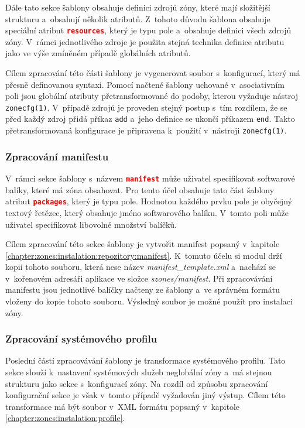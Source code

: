 Dále tato sekce šablony obsahuje definici zdrojů zóny, které mají složitější strukturu a~obsahují několik atributů. Z~tohoto
důvodu šablona obsahuje speciální atribut \lstinline[language=json]{resources}, který je typu pole a~obsahuje definici
všech zdrojů zóny. V~rámci jednotlivého zdroje je použita stejná technika definice atributu jako ve výše zmíněném případě
globálních atributů.

Cílem zpracování této části šablony je vygenerovat soubor s~konfigurací, který má přesně definovanou syntaxi. Pomocí načtené
šablony uchované v~asociativním poli jsou globální atributy přetransformované do podoby, kterou vyžaduje nástroj \verb|zonecfg(1)|.
V~případě zdrojů je proveden stejný postup s~tím rozdílem, že se před každý zdroj přidá příkaz \verb|add| a~jeho definice
se ukončí příkazem \verb|end|. Takto přetransformovaná konfigurace je připravena k~použití v~nástroji \verb|zonecfg(1)|.
\subsubsection{Zpracování manifestu}
\label{chapter:implementation:szones:template:manifest}
V~rámci sekce šablony s~názvem \lstinline[language=json]{manifest} může uživatel specifikovat softwarové balíky, které má zóna obsahovat.
Pro tento účel obsahuje tato část šablony atribut \lstinline[language=json]{packages}, který je typu pole. Hodnotou každého
prvku pole je obyčejný textový řetězec, který obsahuje jméno softwarového balíku. V~tomto poli může uživatel specifikovat libovolné
množství balíčků. 

Cílem zpracování této sekce šablony je vytvořit manifest popsaný v~kapitole \ref{chapter:zones:instalation:repozitory:manifest}.
K~tomuto účelu si modul drží kopii tohoto souboru, která nese název \textit{manifest\_template.xml} a~nachází se v~kořenovém 
adresáři aplikace ve složce \textit{szones/manifest}. Při zpracovávání manifestu jsou jednotlivé balíčky načteny ze šablony
a~ve správném formátu vloženy do kopie tohoto souboru. Výsledný soubor je možné použít pro instalaci zóny.
\subsubsection{Zpracování systémového profilu}
\label{chapter:implementation:szones:template:profile}
Poslední částí zpracovávání šablony je transformace systémového profilu. Tato sekce slouží k~nastavení systémových služeb
neglobální zóny a~má stejnou strukturu jako sekce s~konfigurací zóny. Na rozdíl od způsobu zpracování konfigurační sekce je
však v~tomto případě vyžadován jiný výstup. Cílem této transformace má být soubor v~XML formátu popsaný v~kapitole \ref{chapter:zones:instalation:profile}.

